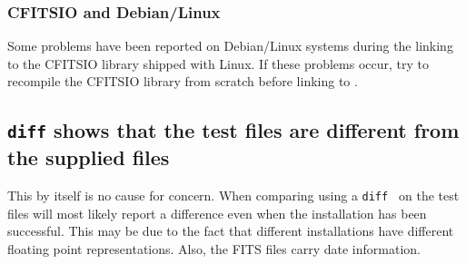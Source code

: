 \documentclass[12pt,twoside]{article}
\begin{document}
\subsubsection*{CFITSIO and Debian/Linux}

Some problems have been reported on Debian/Linux systems during the
linking to the CFITSIO library shipped with Linux. If these problems
occur, try to recompile the CFITSIO library from scratch before linking
to \healpix.






\subsection{\texttt{diff} shows that the test files are different from
the supplied files}

This by itself is no cause for concern. When comparing using a
\texttt{diff } on the test files will most likely report a
difference even when the installation has been successful. 
This  may be due to the fact that
different installations  have different floating point
representations. Also, the FITS files carry date information.

\end{document}

